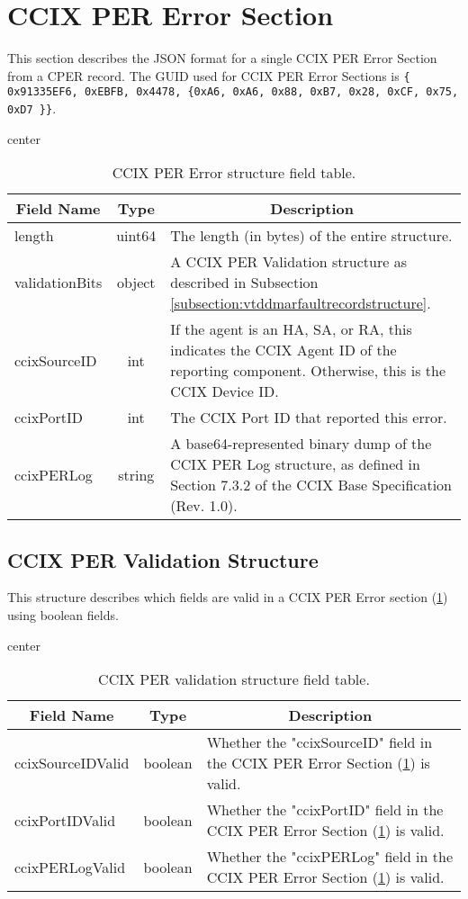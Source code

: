 \documentclass{report}
\newcommand*{\thead}[1]{\multicolumn{1}{|c|}{\bfseries #1}}
\newcommand*{\jsontable}[1]{
    \begin{table}[!ht]
    \label{#1}
    \centering
    \begin{adjustbox}{center}
    \begin{tabular}{|l|c|p{8cm}|}
    \hline
    \thead{Field Name} & \thead{Type} & \thead{Description} \\
    \hline
}
\newcommand*{\jsontableend}[1]{
    \hline
    \end{tabular}
    \end{adjustbox}
    \caption{#1}
    \label{table:#1}
    \end{table}
    \FloatBarrier
}
\begin{document}
\section{CCIX PER Error Section}
\label{section:ccixpererrorsection}
This section describes the JSON format for a single CCIX PER Error Section from a CPER record. The GUID used for CCIX PER Error Sections is \texttt{\{ 0x91335EF6, 0xEBFB, 0x4478, \{0xA6, 0xA6, 0x88, 0xB7, 0x28, 0xCF, 0x75, 0xD7 \}\}}.
\jsontable{table:ccixpererrorsection}
length & uint64 & The length (in bytes) of the entire structure.\\
\hline
validationBits & object & A CCIX PER Validation structure as described in Subsection \ref{subsection:vtddmarfaultrecordstructure}.\\
\hline
ccixSourceID & int & If the agent is an HA, SA, or RA, this indicates the CCIX Agent ID of the reporting component. Otherwise, this is the CCIX Device ID.\\
\hline
ccixPortID & int & The CCIX Port ID that reported this error.\\
\hline
ccixPERLog & string & A base64-represented binary dump of the CCIX PER Log structure, as defined in Section 7.3.2 of the CCIX Base Specification (Rev. 1.0).\\
\jsontableend{CCIX PER Error structure field table.}

\subsection{CCIX PER Validation Structure}
\label{subsection:ccixpervalidationstructure}
This structure describes which fields are valid in a CCIX PER Error section (\ref{section:ccixpererrorsection}) using boolean fields.
\jsontable{table:ccixpervalidationstructure}
ccixSourceIDValid & boolean & Whether the "ccixSourceID" field in the CCIX PER Error Section (\ref{section:ccixpererrorsection}) is valid.\\
\hline
ccixPortIDValid & boolean & Whether the "ccixPortID" field in the CCIX PER Error Section (\ref{section:ccixpererrorsection}) is valid.\\
\hline
ccixPERLogValid & boolean & Whether the "ccixPERLog" field in the CCIX PER Error Section (\ref{section:ccixpererrorsection}) is valid.\\
\jsontableend{CCIX PER validation structure field table.}

\end{document}
